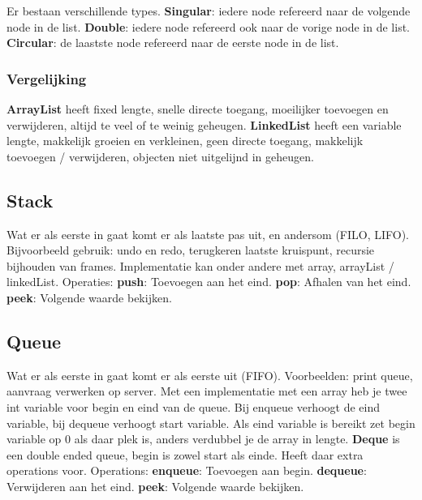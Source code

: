 Er bestaan verschillende types.
\textbf{Singular}: iedere node refereerd naar de volgende node in de list.
\textbf{Double}: iedere node refereerd ook naar de vorige node in de list.
\textbf{Circular}: de laastste node refereerd naar de eerste node in de list.

\subsubsection{Vergelijking}
\textbf{ArrayList} heeft fixed lengte, snelle directe toegang, moeilijker toevoegen en verwijderen, altijd te veel of te weinig geheugen.
\textbf{LinkedList} heeft een variable lengte, makkelijk groeien en verkleinen, geen directe toegang, makkelijk toevoegen / verwijderen, objecten niet uitgelijnd in geheugen.

\subsection{Stack}
Wat er als eerste in gaat komt er als laatste pas uit, en andersom (FILO, LIFO).
Bijvoorbeeld gebruik: undo en redo, terugkeren laatste kruispunt, recursie bijhouden van frames.
Implementatie kan onder andere met array, arrayList / linkedList.
Operaties:
\textbf{push}: Toevoegen aan het eind.
\textbf{pop}: Afhalen van het eind.
\textbf{peek}: Volgende waarde bekijken.

\subsection{Queue}
Wat er als eerste in gaat komt er als eerste uit (FIFO).
Voorbeelden: print queue, aanvraag verwerken op server.
Met een implementatie met een array heb je twee int variable voor begin en eind van de queue.
Bij enqueue verhoogt de eind variable, bij dequeue verhoogt start variable.
Als eind variable is bereikt zet begin variable op 0 als daar plek is, anders verdubbel je de array in lengte.
\textbf{Deque} is een double ended queue, begin is zowel start als einde.
Heeft daar extra operations voor.
Operations:
\textbf{enqueue}: Toevoegen aan begin.
\textbf{dequeue}: Verwijderen aan het eind.
\textbf{peek}: Volgende waarde bekijken.


